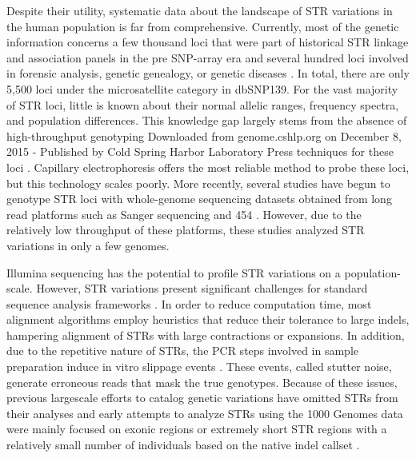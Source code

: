 Despite their utility, systematic data about the landscape of STR variations in the human population is far from comprehensive. Currently, most of the genetic information concerns a few thousand loci that were part of historical STR linkage and association panels in the pre SNP-array era \cite{BromanMurraySheffieldEtAl1998,TamiyaShinyaImanishiEtAl2005} and several hundred loci involved in forensic analysis, genetic genealogy, or genetic diseases \cite{RuitbergReederButler2001,PearsonNicholEdamuraCleary2005}. In total, there are only 5,500 loci under the microsatellite category in dbSNP139. For the vast majority of STR loci, little is known about their normal allelic ranges, frequency spectra, and population differences. This knowledge gap largely stems from the absence of high-throughput genotyping Downloaded from genome.cshlp.org on December 8, 2015 - Published by Cold Spring Harbor Laboratory Press techniques for these loci \cite{JorgensonWitte2007}. Capillary electrophoresis offers the most reliable method to probe these loci, but this technology scales poorly. More recently, several studies have begun to genotype STR loci with whole-genome sequencing datasets obtained from long read platforms such as Sanger sequencing \cite{PayseurJingHaasl2011} and 454 \cite{MollaDelcherSunyaevEtAl2009}. However, due to the relatively low throughput of these platforms, these studies analyzed STR variations in only a few genomes.

Illumina sequencing has the potential to profile STR variations on a population-scale. However, STR variations present significant challenges for standard sequence analysis frameworks \cite{TreangenSalzberg2012}. In order to reduce computation time, most alignment algorithms employ heuristics that reduce their tolerance to large indels, hampering alignment of STRs with large contractions or expansions. In addition, due to the repetitive nature of STRs, the PCR steps involved in sample preparation induce in vitro slippage events \cite{HaugeLitt1993}. These events, called stutter noise, generate erroneous reads that mask the true genotypes. Because of these issues, previous largescale efforts to catalog genetic variations have omitted STRs from their analyses \cite{AbecasisAltshulerAutonEtAl2010} and early attempts to analyze STRs using the 1000 Genomes data were mainly focused on exonic regions \cite{McIverFondonSkinnerEtAl2011} or extremely short STR regions with a relatively small number of individuals based on the native indel callset \cite{AnandaWalshJacobEtAl2012}.

